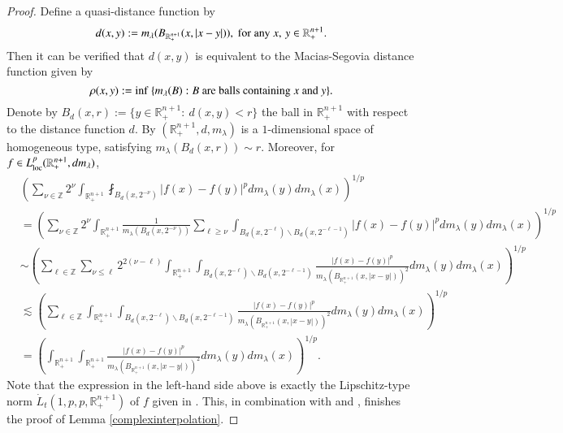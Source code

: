 \documentclass[12pt]{amsart}
\begin{document}
\begin{proof}
Define a quasi-distance function by
$$d(x,y):=m_\lambda(B_{\mathbb{R}_+^{n+1}}(x,|x-y|)),\ {\rm for}\ {\rm any}\ x,\,y\in\mathbb{R}_+^{n+1}.$$
Then it can be verified that $d(x,y)$ is equivalent to the Macias-Segovia distance function given by
$$\rho(x,y):=\inf\ \{m_\lambda(B):B\ {\rm are}\ {\rm balls}\ {\rm containing}\ x\ {\rm and}\ y\}.$$
Denote by $B_d(x,r):=\{y\in\mathbb{R}_+^{n+1}:\ d(x,y)<r\}$ the ball in $\mathbb{R}_{+}^{n+1}$ with respect to the distance function $d$. By \cite[Theorems 2 and 3]{MR546295} $(\mathbb{R}_+^{n+1},d,m_\lambda)$ is a $1$-dimensional space of homogeneous type, satisfying $m_\lambda(B_{d}(x,r))\sim r$. Moreover, for $f\in L_{\rm loc}^p(\mathbb{R}_+^{n+1},dm_\lambda)$,
\begin{align*}
&\left(\sum_{\nu\in\mathbb{Z}}2^\nu\int_{\mathbb{R}_+^{n+1}}\fint_{B_d(x,2^{-\nu})}|f(x)-f(y)|^pdm_\lambda(y)dm_\lambda(x)\right)^{1/p}\\
&=\left(\sum_{\nu\in\mathbb{Z}}2^\nu\int_{\mathbb{R}_+^{n+1}}\frac{1}{m_\lambda(B_d(x,2^{-\nu}))}\sum_{\ell\geq\nu}\int_{B_d(x,2^{-\ell})\backslash B_d(x,2^{-\ell-1})}|f(x)-f(y)|^pdm_\lambda(y)dm_\lambda(x)\right)^{1/p}\\
&\sim\left(\sum_{\ell\in\mathbb{Z}}\sum_{\nu\leq \ell}2^{2(\nu-\ell)}\int_{\mathbb{R}_+^{n+1}}\int_{B_d(x,2^{-\ell})\backslash B_d(x,2^{-\ell-1})}\frac{|f(x)-f(y)|^p}{m_\lambda(B_{\mathbb{R}_+^{n+1}}(x,|x-y|))^2}dm_\lambda(y)dm_\lambda(x)\right)^{1/p}\\
&\lesssim\left(\sum_{\ell\in\mathbb{Z}}\int_{\mathbb{R}_+^{n+1}}\int_{B_d(x,2^{-\ell})\backslash B_d(x,2^{-\ell-1})}\frac{|f(x)-f(y)|^p}{m_\lambda(B_{\mathbb{R}_+^{n+1}}(x,|x-y|))^2}dm_\lambda(y)dm_\lambda(x)\right)^{1/p}\\
&=\left(\int_{\mathbb{R}_+^{n+1}}\int_{\mathbb{R}_+^{n+1}}\frac{|f(x)-f(y)|^p}{m_\lambda(B_{\mathbb{R}_+^{n+1}}(x,|x-y|))^2}dm_\lambda(y)dm_\lambda(x)\right)^{1/p}.
\end{align*}
Note that the expression in the left-hand side above is exactly the Lipschitz-type norm $\dot{L}_t(1,p,p,\mathbb{R}_+^{n+1})$ of $f$ given in \cite[Definition 3.2]{MR2503306}. This, in combination with \cite[Theorem 4.1]{MR2503306} and \cite[Theorem 3.1]{MR2084959}, finishes the proof of Lemma \ref{complexinterpolation}.
\end{proof}
\end{document}
